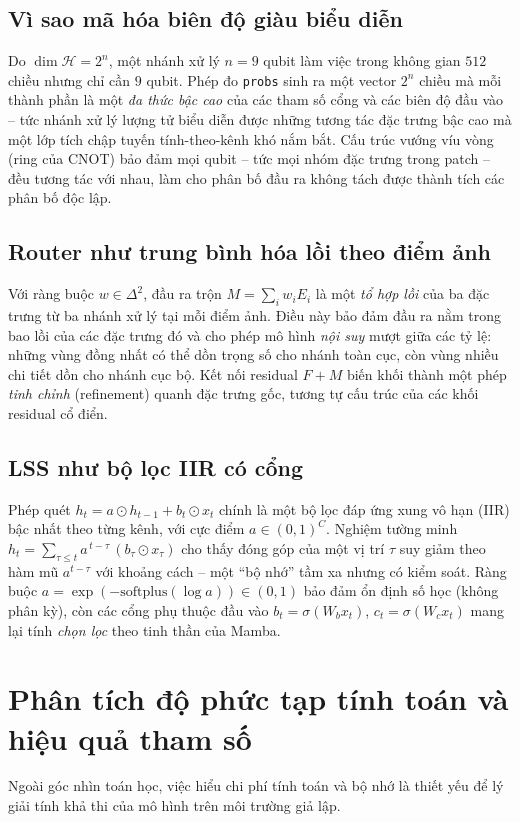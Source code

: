 \subsection{Vì sao mã hóa biên độ giàu biểu diễn}
Do $\dim \mathcal{H} = 2^n$, một nhánh xử lý $n=9$ qubit làm việc trong không gian $512$ chiều nhưng chỉ cần $9$ qubit. Phép đo \texttt{probs} sinh ra một vector $2^n$ chiều mà mỗi thành phần là một \emph{đa thức bậc cao} của các tham số cổng và các biên độ đầu vào -- tức nhánh xử lý lượng tử biểu diễn được những tương tác đặc trưng bậc cao mà một lớp tích chập tuyến tính-theo-kênh khó nắm bắt. Cấu trúc vướng víu vòng (ring của CNOT) bảo đảm mọi qubit -- tức mọi nhóm đặc trưng trong patch -- đều tương tác với nhau, làm cho phân bố đầu ra không tách được thành tích các phân bố độc lập.

\subsection{Router như trung bình hóa lồi theo điểm ảnh}
Với ràng buộc $w\in\Delta^2$, đầu ra trộn $M = \sum_i w_i E_i$ là một \emph{tổ hợp lồi} của ba đặc trưng từ ba nhánh xử lý tại mỗi điểm ảnh. Điều này bảo đảm đầu ra nằm trong bao lồi của các đặc trưng đó và cho phép mô hình \emph{nội suy} mượt giữa các tỷ lệ: những vùng đồng nhất có thể dồn trọng số cho nhánh toàn cục, còn vùng nhiều chi tiết dồn cho nhánh cục bộ. Kết nối residual $F + M$ biến khối thành một phép \emph{tinh chỉnh} (refinement) quanh đặc trưng gốc, tương tự cấu trúc của các khối residual cổ điển.

\subsection{LSS như bộ lọc IIR có cổng}
Phép quét $h_t = a\odot h_{t-1} + b_t\odot x_t$ chính là một bộ lọc đáp ứng xung vô hạn (IIR) bậc nhất theo từng kênh, với cực điểm $a\in(0,1)^C$. Nghiệm tường minh $h_t = \sum_{\tau\le t} a^{\,t-\tau}\, (b_\tau\odot x_\tau)$ cho thấy đóng góp của một vị trí $\tau$ suy giảm theo hàm mũ $a^{t-\tau}$ với khoảng cách -- một ``bộ nhớ'' tầm xa nhưng có kiểm soát. Ràng buộc $a=\exp(-\text{softplus}(\log a))\in(0,1)$ bảo đảm ổn định số học (không phân kỳ), còn các cổng phụ thuộc đầu vào $b_t=\sigma(W_b x_t)$, $c_t=\sigma(W_c x_t)$ mang lại tính \emph{chọn lọc} theo tinh thần của Mamba.

\section{Phân tích độ phức tạp tính toán và hiệu quả tham số}
Ngoài góc nhìn toán học, việc hiểu chi phí tính toán và bộ nhớ là thiết yếu để lý giải tính khả thi của mô hình trên môi trường giả lập.

